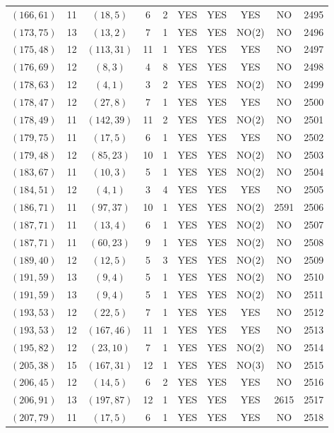 \begin{longtable}{|c|c|c|c|c|c|c|c|c|c|}
$(166, 61)$ & 11 & $(18, 5)$ & 6 & 2 & YES & YES & YES & NO & 2495\\
$(173, 75)$ & 13 & $(13, 2)$ & 7 & 1 & YES & YES & NO(2) & NO & 2496\\
$(175, 48)$ & 12 & $(113, 31)$ & 11 & 1 & YES & YES & YES & NO & 2497\\
$(176, 69)$ & 12 & $(8, 3)$ & 4 & 8 & YES & YES & YES & NO & 2498\\
$(178, 63)$ & 12 & $(4, 1)$ & 3 & 2 & YES & YES & NO(2) & NO & 2499\\
$(178, 47)$ & 12 & $(27, 8)$ & 7 & 1 & YES & YES & YES & NO & 2500\\
$(178, 49)$ & 11 & $(142, 39)$ & 11 & 2 & YES & YES & NO(2) & NO & 2501\\
$(179, 75)$ & 11 & $(17, 5)$ & 6 & 1 & YES & YES & YES & NO & 2502\\
$(179, 48)$ & 12 & $(85, 23)$ & 10 & 1 & YES & YES & NO(2) & NO & 2503\\
$(183, 67)$ & 11 & $(10, 3)$ & 5 & 1 & YES & YES & NO(2) & NO & 2504\\
$(184, 51)$ & 12 & $(4, 1)$ & 3 & 4 & YES & YES & YES & NO & 2505\\
$(186, 71)$ & 11 & $(97, 37)$ & 10 & 1 & YES & YES & NO(2) & 2591 & 2506\\
$(187, 71)$ & 11 & $(13, 4)$ & 6 & 1 & YES & YES & NO(2) & NO & 2507\\
$(187, 71)$ & 11 & $(60, 23)$ & 9 & 1 & YES & YES & NO(2) & NO & 2508\\
$(189, 40)$ & 12 & $(12, 5)$ & 5 & 3 & YES & YES & NO(2) & NO & 2509\\
$(191, 59)$ & 13 & $(9, 4)$ & 5 & 1 & YES & YES & NO(2) & NO & 2510\\
$(191, 59)$ & 13 & $(9, 4)$ & 5 & 1 & YES & YES & NO(2) & NO & 2511\\
$(193, 53)$ & 12 & $(22, 5)$ & 7 & 1 & YES & YES & YES & NO & 2512\\
$(193, 53)$ & 12 & $(167, 46)$ & 11 & 1 & YES & YES & YES & NO & 2513\\
$(195, 82)$ & 12 & $(23, 10)$ & 7 & 1 & YES & YES & NO(2) & NO & 2514\\
$(205, 38)$ & 15 & $(167, 31)$ & 12 & 1 & YES & YES & NO(3) & NO & 2515\\
$(206, 45)$ & 12 & $(14, 5)$ & 6 & 2 & YES & YES & YES & NO & 2516\\
$(206, 91)$ & 13 & $(197, 87)$ & 12 & 1 & YES & YES & YES & 2615 & 2517\\
$(207, 79)$ & 11 & $(17, 5)$ & 6 & 1 & YES & YES & YES & NO & 2518\\

\end{longtable}
